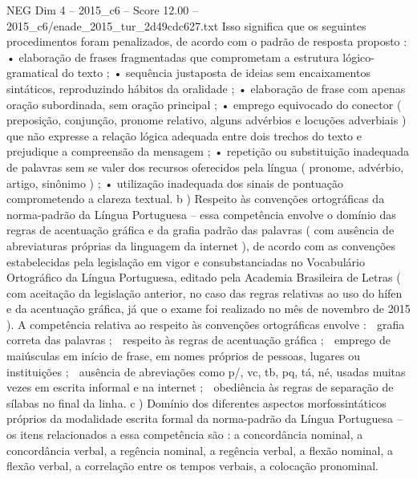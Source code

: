 \begin{textsample}{NEG Dim 4 – 2015\_c6 – Score 12.00 – 2015\_c6/enade\_2015\_tur\_2d49cdc627.txt}
Isso significa que os seguintes procedimentos foram penalizados, de acordo com o padrão de resposta proposto : • elaboração de frases fragmentadas que comprometam a estrutura lógico-gramatical do texto ; • sequência justaposta de ideias sem encaixamentos sintáticos, reproduzindo hábitos da oralidade ; • elaboração de frase com apenas oração subordinada, sem oração principal ; • emprego equivocado do conector ( preposição, conjunção, pronome relativo, alguns advérbios e locuções adverbiais ) que não expresse a relação lógica adequada entre dois trechos do texto e prejudique a compreensão da mensagem ; • repetição ou substituição inadequada de palavras sem se valer dos recursos oferecidos pela língua ( pronome, advérbio, artigo, sinônimo ) ; • utilização inadequada dos sinais de pontuação comprometendo a clareza textual. b ) Respeito às convenções ortográficas da norma-padrão da Língua Portuguesa – essa competência envolve o domínio das regras de acentuação gráfica e da grafia padrão das palavras ( com ausência de abreviaturas próprias da linguagem da internet ), de acordo com as convenções estabelecidas pela legislação em vigor e consubstanciadas no Vocabulário Ortográfico da Língua Portuguesa, editado pela Academia Brasileira de Letras ( com aceitação da legislação anterior, no caso das regras relativas ao uso do hífen e da acentuação gráfica, já que o exame foi realizado no mês de novembro de 2015 ).
A competência relativa ao respeito às convenções ortográficas envolve :  grafia correta das palavras ;  respeito às regras de acentuação gráfica ;  emprego de maiúsculas em início de frase, em nomes próprios de pessoas, lugares ou instituições ;  ausência de abreviações como p/, vc, tb, pq, tá, né, usadas muitas vezes em escrita informal e na internet ;  obediência às regras de separação de sílabas no final da linha. c ) Domínio dos diferentes aspectos morfossintáticos próprios da modalidade escrita formal da norma-padrão da Língua Portuguesa – os itens relacionados a essa competência são : a concordância nominal, a concordância verbal, a regência nominal, a regência verbal, a flexão nominal, a flexão verbal, a correlação entre os tempos verbais, a colocação pronominal.

\end{textsample}
